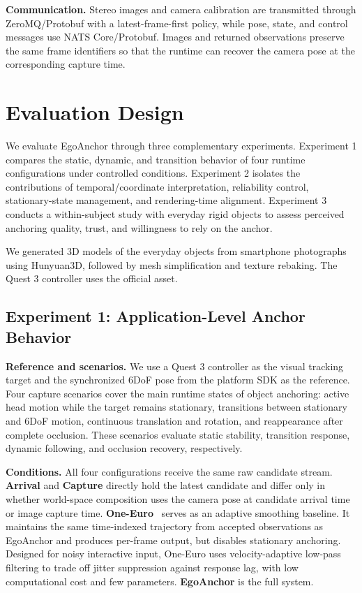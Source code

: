 \documentclass[review]{vgtc}
\begin{document}
\textbf{Communication.}
Stereo images and camera calibration are transmitted through ZeroMQ/Protobuf with a latest-frame-first policy, while pose, state, and control messages use NATS Core/Protobuf. Images and returned observations preserve the same frame identifiers so that the runtime can recover the camera pose at the corresponding capture time.

\section{Evaluation Design}\label{sec:evaluation}

We evaluate EgoAnchor through three complementary experiments. Experiment 1 compares the static, dynamic, and transition behavior of four runtime configurations under controlled conditions. Experiment 2 isolates the contributions of temporal/coordinate interpretation, reliability control, stationary-state management, and rendering-time alignment. Experiment 3 conducts a within-subject study with everyday rigid objects to assess perceived anchoring quality, trust, and willingness to rely on the anchor.

We generated 3D models of the everyday objects from smartphone photographs using Hunyuan3D, followed by mesh simplification and texture rebaking. The Quest 3 controller uses the official asset.

\subsection{Experiment 1: Application-Level Anchor Behavior}\label{sec:exp1-design}

\textbf{Reference and scenarios.}
We use a Quest 3 controller as the visual tracking target and the synchronized 6DoF pose from the platform SDK as the reference. Four capture scenarios cover the main runtime states of object anchoring: active head motion while the target remains stationary, transitions between stationary and 6DoF motion, continuous translation and rotation, and reappearance after complete occlusion. These scenarios evaluate static stability, transition response, dynamic following, and occlusion recovery, respectively.

\textbf{Conditions.}
All four configurations receive the same raw candidate stream. \textbf{Arrival} and \textbf{Capture} directly hold the latest candidate and differ only in whether world-space composition uses the camera pose at candidate arrival time or image capture time. \textbf{One-Euro}~\cite{casiez2012oneeuro} serves as an adaptive smoothing baseline. It maintains the same time-indexed trajectory from accepted observations as EgoAnchor and produces per-frame output, but disables stationary anchoring. Designed for noisy interactive input, One-Euro uses velocity-adaptive low-pass filtering to trade off jitter suppression against response lag, with low computational cost and few parameters. \textbf{EgoAnchor} is the full system.
\end{document}
